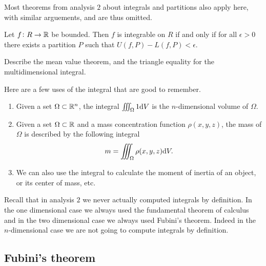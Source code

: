 \documentclass[11pt,a4paper]{article}
\begin{document}
\begin{remark}
  Most theorems from analysis $2$ about integrals and partitions also apply
  here, with similar arguements, and are thus omitted.
\end{remark}

\begin{proposition}
  Let $f \colon R \to \mathbb{R}$ be bounded.
  Then $f$ is integrable on $R$ if and only if
  for all $\epsilon > 0$ there exists a partition $P$ such that
  $U(f,P) - L(f,P) < \epsilon$.
\end{proposition}

\begin{exercise}
  Describe the mean value theorem, and the triangle equality for the
  multidimensional integral.
\end{exercise}

\begin{remark}
  Here are a few uses of the integral that are good to remember.
  \begin{enumerate}
    \item[(1)] Given a set $\Omega \subset \mathbb{R}^n$,
      the integral $\iiint_{\Omega} 1 \mathrm{d} V$ is the $n$-dimensional 
      volume of $\Omega$.
    \item[(2)] Given a set $\Omega \subset \mathbb{R}$ and a mass concentration
      function $\rho(x,y,z)$, the mass of $\Omega$ is described by
      the following integral
      \[
        m = \iiint_{\Omega} \rho(x,y,z) \mathrm{d} V.
      \]
    \item[(3)] We can also use the integral to calculate the moment
      of inertia of an object, or its center of mass, etc.
  \end{enumerate}
\end{remark}

\begin{remark}
  Recall that in analysis $2$ we never actually computed integrals
  by definition.
  In the one dimensional case we always used the fundamental theorem
  of calculus and in the two dimensional case we always used Fubini's theorem.
  Indeed in the $n$-dimensional case we are not going to compute integrals
  by definition.
\end{remark}

\subsection{Fubini's theorem}
\end{document}

